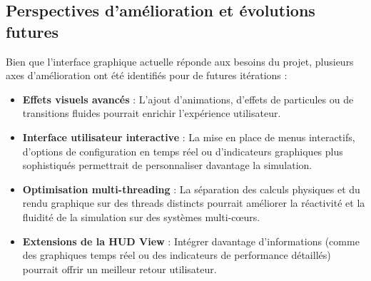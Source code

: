 
\subsection{Perspectives d'amélioration et évolutions futures}\label{subsec:perspectives-d-evolution}
Bien que l'interface graphique actuelle réponde aux besoins du projet, plusieurs axes d'amélioration ont été identifiés pour de futures itérations :
\begin{itemize}
    \item \textbf{Effets visuels avancés} : L'ajout d'animations, d'effets de particules ou de transitions fluides pourrait enrichir l'expérience utilisateur.
    \item \textbf{Interface utilisateur interactive} : La mise en place de menus interactifs, d'options de configuration en temps réel ou d'indicateurs graphiques plus sophistiqués permettrait de personnaliser davantage la simulation.
    \item \textbf{Optimisation multi-threading} : La séparation des calculs physiques et du rendu graphique sur des threads distincts pourrait améliorer la réactivité et la fluidité de la simulation sur des systèmes multi-cœurs.
    \item \textbf{Extensions de la HUD View} : Intégrer davantage d'informations (comme des graphiques temps réel ou des indicateurs de performance détaillés) pourrait offrir un meilleur retour utilisateur.
\end{itemize}

